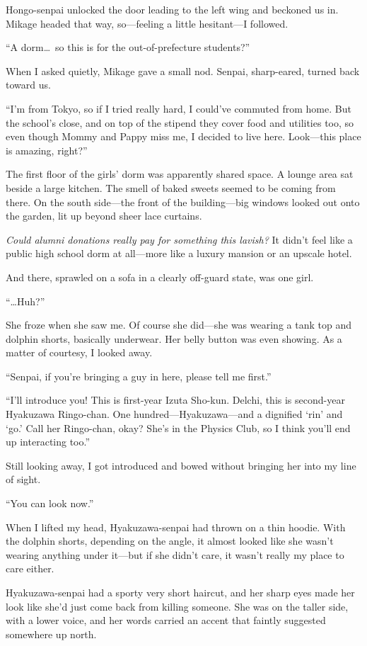 \documentclass[
    a4paper,
    12pt,
    twoside,
    openany,
    UTF8,
    fontset=windows
]{ctexbook}
\begin{document}
Hongo-senpai unlocked the door leading to the left wing and beckoned us in. Mikage headed that way, so---feeling a little hesitant---I followed.

``A dorm\dots\ so this is for the out-of-prefecture students?''

When I asked quietly, Mikage gave a small nod. Senpai, sharp-eared, turned back toward us.

``I'm from Tokyo, so if I tried really hard, I could've commuted from home. But the school's close, and on top of the stipend they cover food and utilities too, so even though Mommy and Pappy miss me, I decided to live here. Look---this place is amazing, right?''

The first floor of the girls' dorm was apparently shared space. A lounge area sat beside a large kitchen. The smell of baked sweets seemed to be coming from there. On the south side---the front of the building---big windows looked out onto the garden, lit up beyond sheer lace curtains.

\textit{Could alumni donations really pay for something this lavish?} It didn't feel like a public high school dorm at all---more like a luxury mansion or an upscale hotel.

And there, sprawled on a sofa in a clearly off-guard state, was one girl.

``\dots Huh?''

She froze when she saw me. Of course she did---she was wearing a tank top and dolphin shorts, basically underwear. Her belly button was even showing. As a matter of courtesy, I looked away.

``Senpai, if you're bringing a guy in here, please tell me first.''

``I'll introduce you! This is first-year Izuta Sho-kun. Delchi, this is second-year Hyakuzawa Ringo-chan. One hundred---Hyakuzawa---and a dignified `rin' and `go.' Call her Ringo-chan, okay? She's in the Physics Club, so I think you'll end up interacting too.''

Still looking away, I got introduced and bowed without bringing her into my line of sight.

``You can look now.''

When I lifted my head, Hyakuzawa-senpai had thrown on a thin hoodie. With the dolphin shorts, depending on the angle, it almost looked like she wasn't wearing anything under it---but if she didn't care, it wasn't really my place to care either.

Hyakuzawa-senpai had a sporty very short haircut, and her sharp eyes made her look like she'd just come back from killing someone. She was on the taller side, with a lower voice, and her words carried an accent that faintly suggested somewhere up north.
\end{document}
